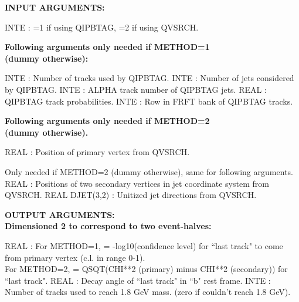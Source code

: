 \par
{}
\par

{\bf INPUT ARGUMENTS:}

\begin{indentlist}{ 3.50cm}{ 3.75cm}
       INTE  : =1 if using QIPBTAG, =2 if using QVSRCH.

\end{indentlist}

  {\bf    Following arguments only needed if METHOD=1\\ 
     (dummy otherwise):}

\begin{indentlist}{ 3.50cm}{ 3.75cm}

        INTE     : Number of tracks used by QIPBTAG.
        INTE       : Number of jets considered by QIPBTAG.
         INTE  : ALPHA track number of QIPBTAG jets.
          REAL : QIPBTAG track probabilities.
   INTE : Row in FRFT bank of QIPBTAG tracks.
\end{indentlist}

{\bf   Following arguments only needed if METHOD=2\\
 (dummy otherwise).}

\begin{indentlist}{ 3.50cm}{ 3.75cm}

        REAL   : Position of primary vertex from QVSRCH.

         Only needed if METHOD=2 (dummy otherwise), same for following arguments.
        REAL  : Positions of two secondary vertices in jet
                         coordinate system from QVSRCH.
        REAL DJET(3,2) : Unitized jet directions from QVSRCH.
  
\end{indentlist}

\par
{\bf OUTPUT ARGUMENTS:\\
 Dimensioned 2 to correspond to two event-halves:}
 
\begin{indentlist}{ 3.50cm}{ 3.75cm}
        REAL  : For METHOD=1, = -log10(confidence level) for
                     ``last track" to come from primary vertex
                     (c.l. in range 0-1).\\
                     For METHOD=2, = QSQT(CHI**2 (primary) minus
                     CHI**2 (secondary)) for ``last track".
        REAL : Decay angle of ``last track" in ``b" rest frame.
        INTE   : Number of tracks used to reach 1.8 GeV mass.
                     (zero if couldn't reach 1.8 GeV).
\end{indentlist}

